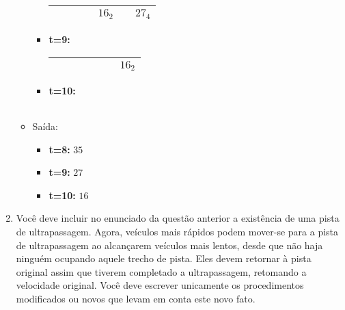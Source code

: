 \begin{enumerate}
\begin{itemize}
\begin{itemize}
\begin{tabular}{|p{1cm}|p{1cm}|p{1cm}|p{1cm}|p{1cm}|p{1cm}|p{1cm}|}
            \hline & & & & $16_2$& & $27_4$ \\ \hline \end{tabular}
        \item \textbf{t=9:} \begin{tabular}{|p{1cm}|p{1cm}|p{1cm}|p{1cm}|p{1cm}|p{1cm}|p{1cm}|}
            \hline & & & & & & $16_2$ \\ \hline \end{tabular}
        \item \textbf{t=10:} \begin{tabular}{|p{1cm}|p{1cm}|p{1cm}|p{1cm}|p{1cm}|p{1cm}|p{1cm}|}
            \hline & & & & & & \\ \hline \end{tabular}
    \end{itemize}

    \item Saída:
    \begin{itemize}
        \item \textbf{t=8:} $35$
        \item \textbf{t=9:} $27$
        \item \textbf{t=10:} $16$
    \end{itemize}
\end{itemize}



\item Você deve incluir no enunciado da questão anterior a
existência de uma pista de ultrapassagem. Agora, veículos mais rápidos 
podem mover-se para a pista de ultrapassagem ao alcançarem veículos mais 
lentos, desde que não haja ninguém ocupando aquele trecho de pista. 
Eles devem retornar à pista original assim que tiverem completado 
a ultrapassagem, retomando a velocidade original. Você deve escrever unicamente
os procedimentos modificados ou novos que levam em conta este novo fato.


\end{enumerate}
